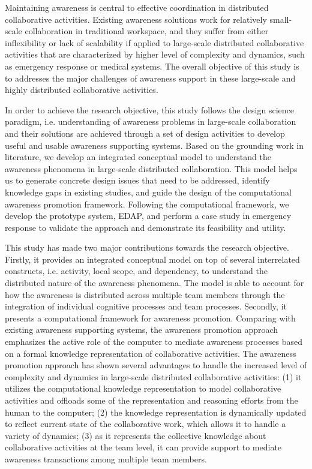 Maintaining awareness is central to effective coordination in distributed collaborative activities. Existing awareness solutions work for relatively small-scale collaboration in traditional workspace, and they suffer from either inflexibility or lack of scalability if applied to large-scale distributed collaborative activities that are characterized by higher level of complexity and dynamics, such as emergency response or medical systems. The overall objective of this study is to addresses the major challenges of awareness support in these large-scale and highly distributed collaborative activities.

In order to achieve the research objective, this study follows the design science paradigm, i.e. understanding of awareness problems in large-scale collaboration and their solutions are achieved through a set of design activities to develop useful and usable awareness supporting systems. Based on the grounding work in literature, we develop an integrated conceptual model to understand the awareness phenomena in large-scale distributed collaboration. This model helps us to generate concrete design issues that need to be addressed, identify knowledge gaps in existing studies, and guide the design of the computational awareness promotion framework. Following the computational framework, we develop the prototype system, EDAP, and perform a case study in emergency response to validate the approach and demonstrate its feasibility and utility.

This study has made two major contributions towards the research objective. Firstly, it provides an integrated conceptual model on top of several interrelated constructs, i.e. activity, local scope, and dependency, to understand the distributed nature of the awareness phenomena. The model is able to account for how the awareness is distributed across multiple team members through the integration of individual cognitive processes and team processes. Secondly, it presents a computational framework for awareness promotion. Comparing with existing awareness supporting systems, the awareness promotion approach emphasizes the active role of the computer to mediate awareness processes based on a formal knowledge representation of collaborative activities. The awareness promotion approach has shown several advantages to handle the increased level of complexity and dynamics in large-scale distributed collaborative activities: (1) it utilizes the computational knowledge representation to model collaborative activities and offloads some of the representation and reasoning efforts from the human to the computer; (2) the knowledge representation is dynamically updated to reflect current state of the collaborative work, which allows it to handle a variety of dynamics; (3) as it represents the collective knowledge about collaborative activities at the team level, it can provide support to mediate awareness transactions among multiple team members.